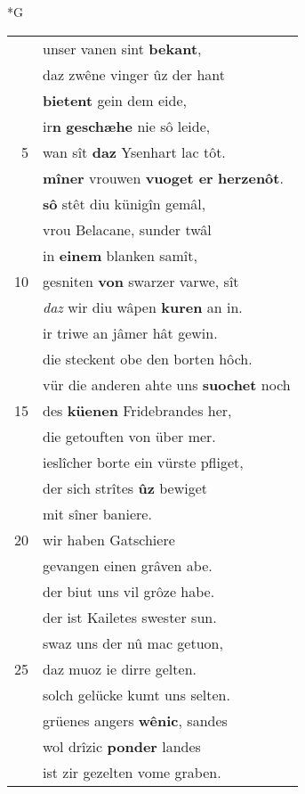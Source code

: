 \documentclass[8pt,a4paper,notitlepage]{article}
\begin{document}
\newpage
\begin{table}[ht]
\begin{minipage}[t]{0.5\linewidth}
\small
\begin{center}*G
\end{center}
\begin{tabular}{rl}
 & unser vanen sint \textbf{bekant},\\ 
 & daz zwêne vinger ûz der hant\\ 
 & \textbf{bietent} gein dem eide,\\ 
 & ir\textbf{n} \textbf{geschæhe} nie sô leide,\\ 
5 & wan sît \textbf{daz} Ysenhart lac tôt.\\ 
 & \textbf{mîner} vrouwen \textbf{vuoget er} \textbf{herzenôt}.\\ 
 & \textbf{sô} stêt diu künigîn gemâl,\\ 
 & vrou Belacane, sunder twâl\\ 
 & in \textbf{einem} blanken samît,\\ 
10 & gesniten \textbf{von} swarzer varwe, sît\\ 
 & \textit{daz} wir diu wâpen \textbf{kuren} an in.\\ 
 & ir triwe an jâmer hât gewin.\\ 
 & die steckent obe den borten hôch.\\ 
 & vür die anderen ahte uns \textbf{suochet} noch\\ 
15 & des \textbf{küenen} Fridebrandes her,\\ 
 & die getouften von über mer.\\ 
 & ieslîcher borte ein vürste pfliget,\\ 
 & der sich strîtes \textbf{ûz} bewiget\\ 
 & mit sîner baniere.\\ 
20 & wir haben Gatschiere\\ 
 & gevangen einen grâven abe.\\ 
 & der biut uns vil grôze habe.\\ 
 & der ist Kailetes swester sun.\\ 
 & swaz uns der nû mac getuon,\\ 
25 & daz muoz ie dirre gelten.\\ 
 & solch gelücke kumt uns selten.\\ 
 & grüenes angers \textbf{wênic}, sandes\\ 
 & wol drîzic \textbf{ponder} landes\\ 
 & ist zir gezelten vome graben.\\ 

\end{tabular}
\end{minipage}
\end{table}
\end{document}
